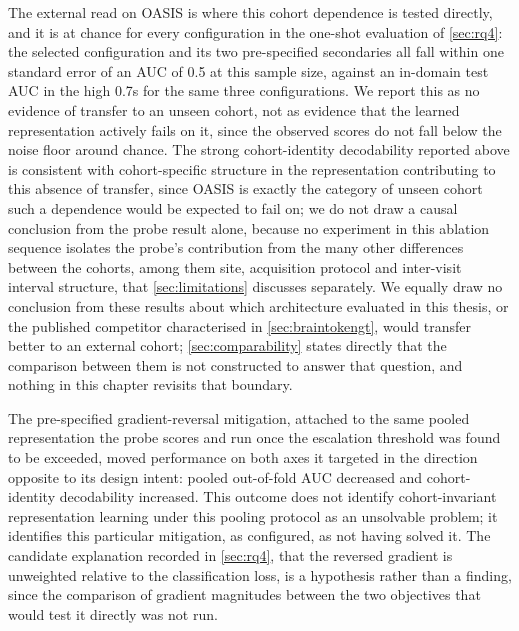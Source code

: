 The external read on \ac{OASIS} is where this cohort dependence is tested directly, and it
is at chance for every configuration in the one-shot evaluation of \autoref{sec:rq4}: the
selected configuration and its two pre-specified secondaries all fall within one standard
error of an \ac{AUC} of 0.5 at this sample size, against an in-domain test \ac{AUC} in the
high 0.7s for the same three configurations. We report this as no evidence of transfer to
an unseen cohort, not as evidence that the learned representation actively fails on it,
since the observed scores do not fall below the noise floor around chance. The strong
cohort-identity decodability reported above is consistent with cohort-specific structure in
the representation contributing to this absence of transfer, since \ac{OASIS} is exactly
the category of unseen cohort such a dependence would be expected to fail on; we do not
draw a causal conclusion from the probe result alone, because no experiment in this
ablation sequence isolates the probe's contribution from the many other differences between
the cohorts, among them site, acquisition protocol and inter-visit interval structure, that
\autoref{sec:limitations} discusses separately. We equally draw no conclusion from these
results about which architecture evaluated in this thesis, or the published competitor
characterised in \autoref{sec:braintokengt}, would transfer better to an external cohort;
\autoref{sec:comparability} states directly that the comparison between them is not
constructed to answer that question, and nothing in this chapter revisits that boundary.

The pre-specified gradient-reversal mitigation, attached to the same pooled representation
the probe scores and run once the escalation threshold was found to be exceeded, moved
performance on both axes it targeted in the direction opposite to its design intent: pooled
out-of-fold \ac{AUC} decreased and cohort-identity decodability increased. This outcome
does not identify cohort-invariant representation learning under this pooling protocol as
an unsolvable problem; it identifies this particular mitigation, as configured, as not
having solved it. The candidate explanation recorded in \autoref{sec:rq4}, that the
reversed gradient is unweighted relative to the classification loss, is a hypothesis rather
than a finding, since the comparison of gradient magnitudes between the two objectives that
would test it directly was not run.

